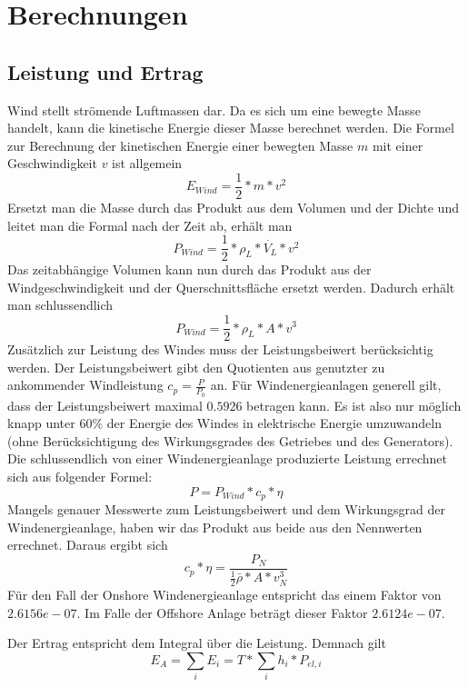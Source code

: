 \documentclass[a4paper,12pt]{article}
\begin{document}
	\newpage
	
	\section{Berechnungen}
	\subsection{Leistung und Ertrag}
	Wind stellt strömende Luftmassen dar. Da es sich um eine bewegte Masse handelt, kann die kinetische Energie dieser Masse berechnet werden.\newline
	Die Formel zur Berechnung der kinetischen Energie einer bewegten Masse $m$ mit einer Geschwindigkeit $v$ ist allgemein
	\begin{equation}
	E_{Wind} = \frac{1}{2}*m*v^2
	\end{equation}
	\noindent Ersetzt man die Masse durch das Produkt aus dem Volumen und der Dichte und leitet man die Formal nach der Zeit ab, erhält man
	\begin{equation}
	P_{Wind} = \frac{1}{2}*\rho_L*\dot{V_L}*v^2
	\end{equation}
	Das zeitabhängige Volumen kann nun durch das Produkt aus der Windgeschwindigkeit und der Querschnittsfläche ersetzt werden. Dadurch erhält man schlussendlich
	\begin{equation}
	P_{Wind} = \frac{1}{2}*\rho_L*A*v^3
	\end{equation}
	Zusätzlich zur Leistung des Windes muss der Leistungsbeiwert berücksichtig werden. Der Leistungsbeiwert gibt den Quotienten aus genutzter zu ankommender Windleistung $c_p = \frac{P}{P_0}$ an. Für Windenergieanlagen generell gilt, dass der Leistungsbeiwert maximal $0.5926$ betragen kann. Es ist also nur möglich knapp unter $60\%$ der Energie des Windes in elektrische Energie umzuwandeln (ohne Berücksichtigung des Wirkungsgrades des Getriebes und des Generators).\newline
	Die schlussendlich von einer Windenergieanlage produzierte Leistung errechnet sich aus folgender Formel:
	\begin{equation}
	P = P_{Wind}*c_p*\eta
	\end{equation}
	Mangels genauer Messwerte zum Leistungsbeiwert und dem Wirkungsgrad der Windenergieanlage, haben wir das Produkt aus beide aus den Nennwerten errechnet.\newline
	Daraus ergibt sich
	\begin{equation}
	c_p * \eta = \frac{P_N}{\frac{1}{2}\bar{\rho}*A*v_N^3}
	\end{equation}
	Für den Fall der Onshore Windenergieanlage entspricht das einem Faktor von $2.6156e-07$. Im Falle der Offshore Anlage beträgt dieser Faktor $2.6124e-07$.\\ \par
	Der Ertrag entspricht dem Integral über die Leistung. \newline Demnach gilt\begin{equation}
	E_A = \sum_{i} E_i = T * \sum_{i} h_i * P_{el, i}
	\end{equation}
\end{document}
